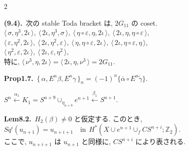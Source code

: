 \documentclass[10pt, leqno]{ltjsarticle}
\newcommand{\todai}[2][]{\{\,#2\,\}_{#1}}      %
\newcommand{\todas}[1]{\langle\,#1\,\rangle}
\newcommand{\gen}[1]{\{#1\}}       %
\newcommand{\z}{\mathbb{Z}}
\newcommand{\sq}[1]{Sq^{#1}}
\numberwithin{equation}{section}
\theoremstyle{plain}
\theoremstyle{definition}
\theoremstyle{remark}
\begin{document}
\begin{paracol}{2}
\switchcolumn

\noindent
\textbf{(9.4).}\
次の stable Toda bracket は, \(2G_{11}\) の coset.\\
\(\todas{\sigma,\eta^3,2\iota},\ 
\todas{2\iota,\eta^3,\sigma},\
\todas{\eta\circ\varepsilon,\eta,2\iota},\
\todas{2\iota,\eta,\eta\circ\varepsilon},\)\\
\(\todas{\varepsilon,\eta^2,2\iota},\
\todas{2\iota,\eta^2,\varepsilon},\
\todas{\eta,\eta\circ\varepsilon,2\iota},\
\todas{2\iota,\eta\circ\varepsilon,\eta},\)\\
\(\todas{\eta^2,\varepsilon,2\iota},\
\todas{2\iota,\varepsilon,\eta^2},\)\\
特に, \(\todas{\nu^3,\eta,2\iota}=\todas{2\iota,\eta,\nu^3}=2G_{11}.\)

\noindent
\textbf{Prop1.7.}\
\(\todai[n]{\alpha, E^n\beta, E^n\gamma}
= (-1)^n\gen{\overline{\alpha}\circ E^n\widetilde{\gamma}}\).

\noindent
\(S^n\xleftarrow{\alpha_1}
K_1 = S^{n+9}\cup_{\eta_{n+9}}e^{n+1} \xleftarrow{\beta_1}
S^{n+1}\).

\noindent
\textbf{Lem8.2.}\
$H_2(\beta)\ne0$ と仮定する. このとき,\\
\(\sq{i}(u_{n+1}) = u_{n+i+1}
\quad\text{in} \ \ H^\ast (X\cup e^{n+1}\cup_f CS^{n+i}; \z_2).\)\\
ここで, $u_{n+i+1}$ は $u_{n+1}$ と同様に, $CS^{n+i}$ により表される. 


\end{paracol}
\end{document}
